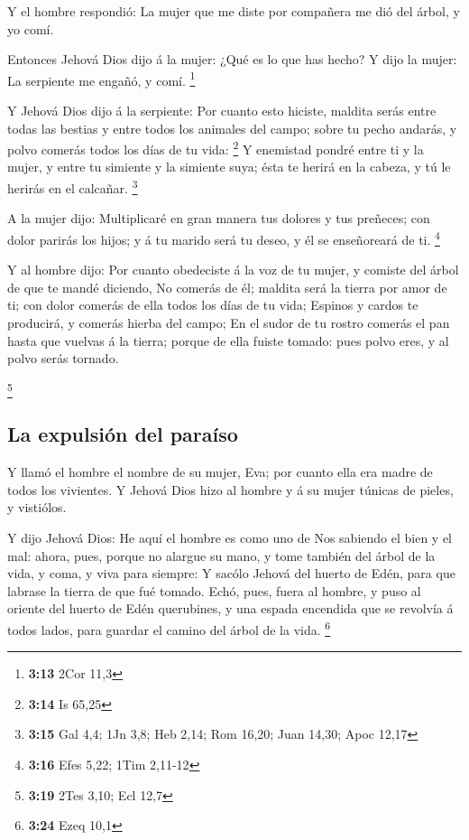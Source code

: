  Y el hombre respondió: La mujer que me diste por
compañera me dió del árbol, y yo comí.

 Entonces Jehová Dios dijo á la mujer: ¿Qué es lo que has
hecho? Y dijo la mujer: La serpiente me engañó, y comí. \footnote{\textbf{3:13}
  2Cor 11,3}

 Y Jehová Dios dijo á la serpiente: Por cuanto esto
hiciste, maldita serás entre todas las bestias y entre todos los
animales del campo; sobre tu pecho andarás, y polvo comerás todos los
días de tu vida: \footnote{\textbf{3:14} Is 65,25}  Y
enemistad pondré entre ti y la mujer, y entre tu simiente y la simiente
suya; ésta te herirá en la cabeza, y tú le herirás en el calcañar.
\footnote{\textbf{3:15} Gal 4,4; 1Jn 3,8; Heb 2,14; Rom 16,20; Juan
  14,30; Apoc 12,17}

 A la mujer dijo: Multiplicaré en gran manera tus dolores
y tus preñeces; con dolor parirás los hijos; y á tu marido será tu
deseo, y él se enseñoreará de ti. \footnote{\textbf{3:16} Efes 5,22;
  1Tim 2,11-12}

 Y al hombre dijo: Por cuanto obedeciste á la voz de tu
mujer, y comiste del árbol de que te mandé diciendo, No comerás de él;
maldita será la tierra por amor de ti; con dolor comerás de ella todos
los días de tu vida;  Espinos y cardos te producirá, y
comerás hierba del campo;  En el sudor de tu rostro
comerás el pan hasta que vuelvas á la tierra; porque de ella fuiste
tomado: pues polvo eres, y al polvo serás tornado.

\footnote{\textbf{3:19} 2Tes 3,10; Ecl 12,7}

\hypertarget{la-expulsiuxf3n-del-parauxedso}{%
\subsection{La expulsión del
paraíso}\label{la-expulsiuxf3n-del-parauxedso}}

 Y llamó el hombre el nombre de su mujer, Eva; por cuanto
ella era madre de todos los vivientes.  Y Jehová Dios
hizo al hombre y á su mujer túnicas de pieles, y vistiólos.

 Y dijo Jehová Dios: He aquí el hombre es como uno de Nos
sabiendo el bien y el mal: ahora, pues, porque no alargue su mano, y
tome también del árbol de la vida, y coma, y viva para siempre:
 Y sacólo Jehová del huerto de Edén, para que labrase la
tierra de que fué tomado.  Echó, pues, fuera al hombre, y
puso al oriente del huerto de Edén querubines, y una espada encendida
que se revolvía á todos lados, para guardar el camino del árbol de la
vida. \footnote{\textbf{3:24} Ezeq 10,1}

